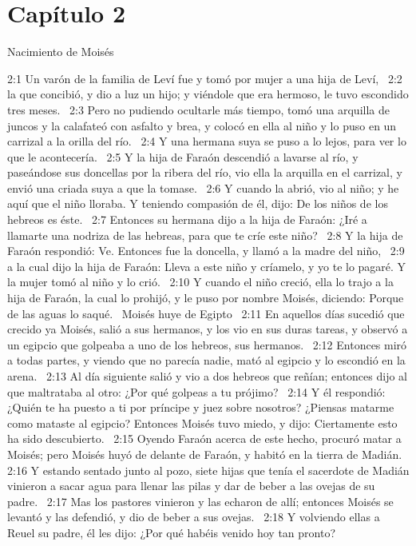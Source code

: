 \section*{Capítulo 2}
Nacimiento de Moisés  

2:1 Un varón de la familia de Leví fue y tomó por mujer a una hija de Leví,  
2:2 la que concibió, y dio a luz un hijo; y viéndole que era hermoso, le tuvo escondido tres meses.  
2:3 Pero no pudiendo ocultarle más tiempo, tomó una arquilla de juncos y la calafateó con asfalto y brea, y colocó en ella al niño y lo puso en un carrizal a la orilla del río.  
2:4 Y una hermana suya se puso a lo lejos, para ver lo que le acontecería.  
2:5 Y la hija de Faraón descendió a lavarse al río, y paseándose sus doncellas por la ribera del río, vio ella la arquilla en el carrizal, y envió una criada suya a que la tomase.  
2:6 Y cuando la abrió, vio al niño; y he aquí que el niño lloraba. Y teniendo compasión de él, dijo: De los niños de los hebreos es éste.  
2:7 Entonces su hermana dijo a la hija de Faraón: ¿Iré a llamarte una nodriza de las hebreas, para que te críe este niño?  
2:8 Y la hija de Faraón respondió: Ve. Entonces fue la doncella, y llamó a la madre del niño,  
2:9 a la cual dijo la hija de Faraón: Lleva a este niño y críamelo, y yo te lo pagaré. Y la mujer tomó al niño y lo crió.  
2:10 Y cuando el niño creció, ella lo trajo a la hija de Faraón, la cual lo prohijó, y le puso por nombre Moisés, diciendo: Porque de las aguas lo saqué.  
Moisés huye de Egipto  
2:11 En aquellos días sucedió que crecido ya Moisés, salió a sus hermanos, y los vio en sus duras tareas, y observó a un egipcio que golpeaba a uno de los hebreos, sus hermanos.  
2:12 Entonces miró a todas partes, y viendo que no parecía nadie, mató al egipcio y lo escondió en la arena.  
2:13 Al día siguiente salió y vio a dos hebreos que reñían; entonces dijo al que maltrataba al otro: ¿Por qué golpeas a tu prójimo?  
2:14 Y él respondió: ¿Quién te ha puesto a ti por príncipe y juez sobre nosotros? ¿Piensas matarme como mataste al egipcio? Entonces Moisés tuvo miedo, y dijo: Ciertamente esto ha sido descubierto.  
2:15 Oyendo Faraón acerca de este hecho, procuró matar a Moisés; pero Moisés huyó de delante de Faraón, y habitó en la tierra de Madián. 
2:16 Y estando sentado junto al pozo, siete hijas que tenía el sacerdote de Madián vinieron a sacar agua para llenar las pilas y dar de beber a las ovejas de su padre.  
2:17 Mas los pastores vinieron y las echaron de allí; entonces Moisés se levantó y las defendió, y dio de beber a sus ovejas.  
2:18 Y volviendo ellas a Reuel su padre, él les dijo: ¿Por qué habéis venido hoy tan pronto?  
